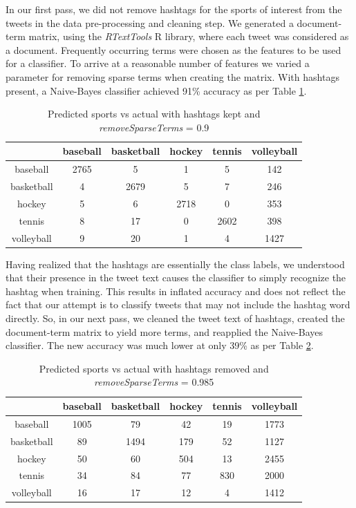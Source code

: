 \documentclass[journal, a4paper]{IEEEtran}
\begin{document}
In our first pass, we did not remove hashtags for the sports of interest from the tweets in the data pre-processing and cleaning step. We generated a document-term matrix, using the \textit{RTextTools} R library, where each tweet was considered as a document. Frequently occurring terms were chosen as the features to be used for a classifier. To arrive at a reasonable number of features we varied a parameter for removing sparse terms when creating the matrix. With hashtags present, a Naive-Bayes classifier achieved 91\% accuracy as per Table \ref{Tab:2}.
\begin{table}[!ht]
	\begin{center}
		\begin{tabular}{|c|c c c c c|}
			\hline
		\diagbox[width=8em]{actual}{predicted}& baseball & basketball & hockey & tennis& volleyball\\
			\hline
			baseball & 2765 & 5 & 1 & 5 &142\\
			basketball & 4 & 2679&5& 7& 246\\
			hockey & 5 & 6 & 2718 & 0 & 353\\
			tennis & 8 & 17 & 0 & 2602 & 398\\
			volleyball & 9 & 20&  1 & 4 &1427\\
			\hline
		\end{tabular}
	\end{center}
	\caption{Predicted sports vs actual with hashtags kept and \textit{removeSparseTerms} = 0.9}\label{Tab:2}
\end{table}

Having realized that the hashtags are essentially the class labels, we understood that their presence in the tweet text causes the classifier to simply recognize the hashtag when training. This results in inflated accuracy and does not reflect the fact that our attempt is to classify tweets that may not include the hashtag word directly. So, in our next pass, we cleaned the tweet text of hashtags, created the document-term matrix to yield more terms, and reapplied the Naive-Bayes classifier. The new accuracy was much lower at only 39\% as per Table \ref{Tab:3}.
\begin{table}[ht]
	\begin{center}
		\begin{tabular}{|c|c c c c c|}
			\hline
			\diagbox[width=8em]{actual}{predicted}& baseball & basketball & hockey & tennis& volleyball\\
			\hline
			baseball &1005&79&42&19&1773\\
			basketball & 89 & 1494& 179 & 52 & 1127\\
			hockey &50&60&504&13&2455\\
			tennis &34&84&77&830&2000\\
			volleyball& 16 & 17 & 12 & 4&1412\\
			\hline
		\end{tabular}
	\end{center}
	\caption{Predicted sports vs actual with hashtags removed and \textit{removeSparseTerms} = 0.985}\label{Tab:3}
\end{table}
\end{document}
